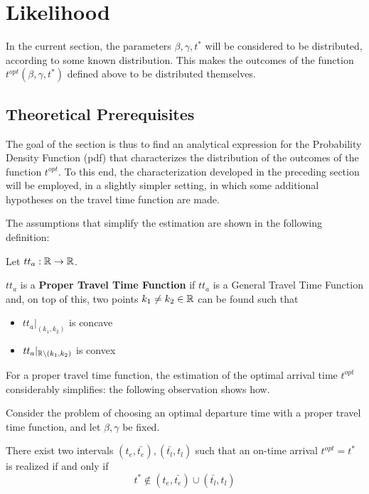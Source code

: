 \section{Likelihood}

In the current section,
the parameters \(\beta, \gamma, t^*\) will be considered to be distributed, according to some known distribution.
This makes the outcomes of the function \(t^{opt}(\beta, \gamma, t^*)\) defined above to be distributed themselves.

\subsection{Theoretical Prerequisites}


The goal of the section is thus to find an analytical expression for the Probability Density Function (pdf) that characterizes the distribution of the outcomes of the function \(t^{opt}\).
To this end, the characterization developed in the preceding section will be employed,
in a slightly simpler setting, in which some additional hypotheses on the travel time function are made.

The assumptions that simplify the estimation are shown in the following definition:
\begin{definition}
  \label{def:proper_tt}
  Let \(tt_a:\mathbb{R}\rightarrow\mathbb{R}\).

  \(tt_a\) is a \textbf{Proper Travel Time Function} if \(tt_a\) is a General Travel Time Function and,
  on top of this, 
  two points \(k_1\neq k_2 \in \mathbb{R}\) can be found such that
  \begin{itemize}
  \item \(tt_a|_{(k_1, k_2)}\) is concave
  \item \(tt_a|_{\mathbb{R}\setminus(k_1, k_2)}\) is convex
  \end{itemize}
\end{definition}

For a proper travel time function,
the estimation of the optimal arrival time \(t^{opt}\) considerably simplifies:
the following observation shows how.
\begin{obs}
  Consider the problem of choosing an optimal departure time
  with a proper travel time function, and let \(\beta, \gamma\) be fixed.

  There exist two intervals \((t_e, \bar{t_e}), (\bar{t_l}, t_l)\) such that an on-time arrival \(t^{opt} = t^*\) is realized if and only if
  \begin{equation*}
    t^* \notin (t_e, \bar{t_e}) \cup (\bar{t_l}, t_l)
  \end{equation*}
\end{obs}

